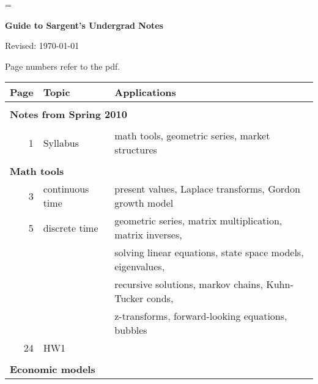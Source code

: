 \documentclass[11pt]{article}
\begin{document}
\parskip=\bigskipamount
\parindent=0.0in
\thispagestyle{empty}

\centerline{\Large \bf Guide to Sargent's Undergrad Notes}
\centerline{Revised: \today}

\bigskip
Page numbers refer to the pdf.

\bigskip
{\small
\begin{tabular}{rll}
\toprule
Page    &  Topic    &  Applications \\
\midrule
& \\ \multicolumn{3}{l}{\bf Notes from Spring 2010 }   \\ & \\

1       &  Syllabus &  math tools, geometric series, market structures \\

& \\ \multicolumn{3}{l}{\bf Math tools}   \\

3       &  continuous time  &  present values, Laplace transforms, Gordon growth model\\
5       &  discrete time    &  geometric series, matrix multiplication, matrix inverses, \\
        &                   &  solving linear equations, state space models, eigenvalues, \\
        &                   &  recursive solutions, markov chains, Kuhn-Tucker conds,  \\
        &                   &  z-transforms, forward-looking equations, bubbles  \\
24      & HW1   \\

& \\ \multicolumn{3}{l}{\bf Economic models}   \\


\end{tabular}}
\end{document}

